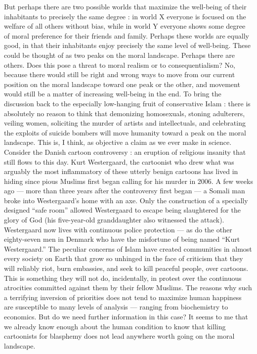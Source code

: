 \documentclass[a4paper,14pt]{extarticle}
\begin{document}
But perhaps there are two possible worlds that maximize the well-being of their inhabitants to precisely the same degree :
in world X everyone is focused on the welfare of all others without bias, while in world Y everyone shows some degree of moral preference for their friends and family.
Perhaps these worlds are equally good, in that their inhabitants enjoy precisely the same level of well-being.
These could be thought of as two peaks on the moral landscape.
Perhaps there are others.
Does this pose a threat to moral realism or to consequentialism?
No, because there would still be right and wrong ways to move from our current position on the moral landscape toward one peak or the other, and movement would still be a matter of increasing well-being in the end.
To bring the discussion back to the especially low-hanging fruit of conservative Islam :
there is absolutely no reason to think that demonizing homosexuals, stoning adulterers, veiling women, soliciting the murder of artists and intellectuals, and celebrating the exploits of suicide bombers will move humanity toward a peak on the moral landscape.
This is, I think, as objective a claim as we ever make in science.
Consider the Danish cartoon controversy :
an eruption of religious insanity that still flows to this day.
Kurt Westergaard, the cartoonist who drew what was arguably the most inflammatory of these utterly benign cartoons has lived in hiding since pious Muslims first began calling for his murder in 2006.
A few weeks ago --- more than three years after the controversy first began --- a Somali man broke into Westergaard's home with an axe.
Only the construction of a specially designed ``safe room'' allowed Westergaard to escape being slaughtered for the glory of God (his five-year-old granddaughter also witnessed the attack).
Westergaard now lives with continuous police protection --- as do the other eighty-seven men in Denmark who have the misfortune of being named ``Kurt Westergaard.''
The peculiar concerns of Islam have created communities in almost every society on Earth that grow so unhinged in the face of criticism that they will reliably riot, burn embassies, and seek to kill peaceful people, over cartoons.
This is something they will not do, incidentally, in protest over the continuous atrocities committed against them by their fellow Muslims.
The reasons why such a terrifying inversion of priorities does not tend to maximize human happiness are susceptible to many levels of analysis --- ranging from biochemistry to economics.
But do we need further information in this case?
It seems to me that we already know enough about the human condition to know that killing cartoonists for blasphemy does not lead anywhere worth going on the moral landscape.
\end{document}
